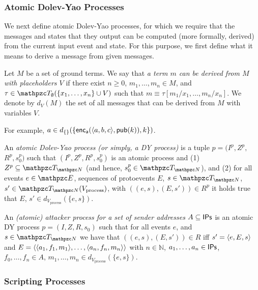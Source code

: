 \subsubsection{Atomic Dolev-Yao Processes}  

We next define
atomic Dolev-Yao processes, for which we require that the
messages and states that they output can be computed (more
formally, derived) from the current input event and
state. For this purpose, we first define what it means to
derive a message from given messages.




\begin{definition}
  Let $M$ be a set of ground terms. We say that \emph{a
    term $m$ can be derived from $M$ with placeholders $V$} if there
  exist $n\ge 0$, $m_1,\ldots,m_n\in M$, and $\tau\in
  \gterms_{\emptyset}(\{x_1,\ldots,x_n\} \cup V)$ such that $m\equiv
  \tau[m_1/x_1,\ldots,m_n/x_n]$. We denote by $d_V(M)$ the set of all
  messages that can be derived from $M$ with variables $V$.
\end{definition}
For example, $a\in d_{\{\}}(\{\mathsf{enc}_\mathsf{a}(\langle a,b,c\rangle,\mathsf{pub}(k)), k\})$.

\begin{definition} \label{def:adyp} An \emph{atomic Dolev-Yao process
    (or simply, a DY process)} is a tuple $p = (I^p, Z^p,$ $R^p,
  s^p_0)$ such that $(I^p, Z^p, R^p, s^p_0)$ is an atomic process and
  (1) $Z^p \subseteq \gterms_{\nonces}$ (and hence, $s^p_0\in
  \gterms_{\nonces}$), and (2) for all events $e \in \events$,
  sequences of protoevents $E$, $s\in \gterms_{\nonces}$, $s'\in
  \gterms_{\nonces}(V_{\text{process}})$, with $((e, s), (E, s')) \in R^p$ it holds
  true that $E$, $s' \in d_{V_{\text{process}}}(\{e,s\})$.
\end{definition}

\begin{definition}\label{def:atomicattacker}
  An \emph{(atomic) attacker process for a set of sender addresses
    $A\subseteq \mathsf{IPs}$} is an atomic DY process $p = (I, Z, R,
  s_0)$ such that for all events $e$, and $s\in \gterms_{\nonces}$ we
  have that $((e, s), (E,s')) \in R$ iff $s'=\langle e, E, s\rangle$ and
  $E=\langle\langle a_1, f_1, m_1\rangle, \dots, \langle a_n, f_n, m_n\rangle\rangle$ with $n \in
  \mathbb{N}$, $a_1,\dots,a_n\in \mathsf{IPs}$, $f_0,\dots,f_n\in A$,
  $m_1,\dots,m_n\in d_{V_{\text{process}}}(\{e,s\})$.
\end{definition}


\subsubsection{Scripting Processes}

